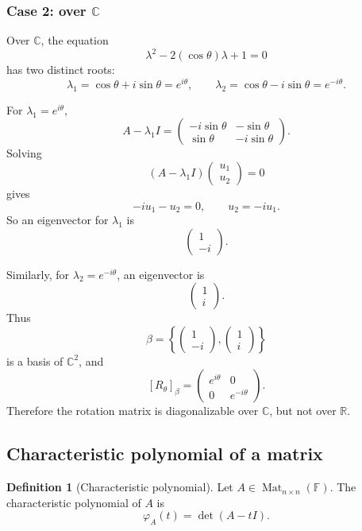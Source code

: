 \documentclass[11pt]{article}
\newcommand{\F}{\mathbb F}
\newcommand{\R}{\mathbb R}
\newcommand{\C}{\mathbb C}
\newcommand{\Mat}{\operatorname{Mat}}
\theoremstyle{definition}
\newtheorem{definition}{Definition}[section]
\theoremstyle{plain}
\begin{document}
\subsubsection*{Case 2: over \texorpdfstring{$\C$}{C}}

Over $\C$, the equation
\[
\lambda^2-2(\cos\theta)\lambda+1=0
\]
has two distinct roots:
\[
\lambda_1=\cos\theta+i\sin\theta=e^{i\theta},
\qquad
\lambda_2=\cos\theta-i\sin\theta=e^{-i\theta}.
\]

For $\lambda_1=e^{i\theta}$,
\[
A-\lambda_1 I
=\begin{pmatrix}
-i\sin\theta&-\sin\theta\\
\sin\theta&-i\sin\theta
\end{pmatrix}.
\]
Solving
\[
(A-\lambda_1 I)
\begin{pmatrix}u_1\\u_2\end{pmatrix}=0
\]
gives
\[
-i u_1-u_2=0,
\qquad
u_2=-iu_1.
\]
So an eigenvector for $\lambda_1$ is
\[
\begin{pmatrix}1\\-i\end{pmatrix}.
\]

Similarly, for $\lambda_2=e^{-i\theta}$, an eigenvector is
\[
\begin{pmatrix}1\\i\end{pmatrix}.
\]
Thus
\[
\beta=
\left\{
\begin{pmatrix}1\\-i\end{pmatrix},
\begin{pmatrix}1\\i\end{pmatrix}
\right\}
\]
is a basis of $\C^2$, and
\[
[R_\theta]_{\beta}
=\begin{pmatrix}
e^{i\theta}&0\\
0&e^{-i\theta}
\end{pmatrix}.
\]
Therefore the rotation matrix is diagonalizable over $\C$, but not over $\R$.

\subsection{Characteristic polynomial of a matrix}

\begin{definition}[Characteristic polynomial]
Let $A\in\Mat_{n\times n}(\F)$.  The characteristic polynomial of $A$ is
\[
\varphi_A(t)=\det(A-tI).
\]
\end{definition}
\end{document}
